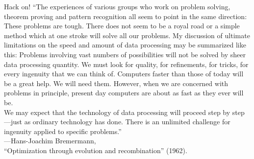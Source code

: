 \documentclass[mathserif,xcolor={dvipsnames,table}]{beamer}
\begin{document}
\begin{frame}{Hack on!}
\small{``The experiences of various groups who work on problem solving, theorem
proving and pattern recognition all seem to point in the same direction: These
problems are tough. There does not seem to be a royal road or a simple method
which at one stroke will solve all our problems. My discussion of ultimate
limitations on the speed and amount of data processing may be summarized like
this: Problems involving vast numbers of possibilities will not be solved by
sheer data processing quantity. We must look for quality, for refinements, for
tricks, for every ingenuity that we can think of. Computers faster than those
of today will be a great help. We will need them. However, when we are
concerned with problems in principle, present day computers are about as fast
as they ever will be.\\
\vspace{.1in}
We may expect that the technology of data processing will proceed step by
step---just as ordinary technology has done. There is an unlimited challenge
for ingenuity applied to specific problems.''}\\
\vspace{.1in}
\scriptsize{\hfill---Hans-Joachim Bremermann,\\ \hfill``Optimization through evolution and recombination'' (1962).}
\end{frame}

\begin{frame}
\end{frame}
\end{document}
